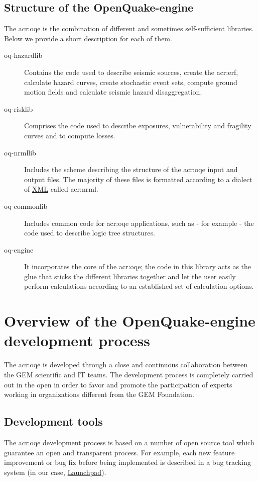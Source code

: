 \subsection{Structure of the OpenQuake-engine}
The \gls{acr:oqe} is the combination of different and sometimes 
self-sufficient libraries. Below we provide a short description for each of
them.
\begin{description}
    \item [oq-hazardlib] Contains the code used to describe 
        seismic sources, create the \gls{acr:erf}, calculate hazard curves, 
        create stochastic event sets, compute ground motion fields and 
        calculate seismic hazard disaggregation.
    \item [oq-risklib] Comprises the code used to describe exposures, 
        vulnerability and fragility curves and to compute losses.
    \item [oq-nrmllib] Includes the scheme describing the structure of 
        the \gls{acr:oqe} input and output files. The majority of these files 
        is formatted according to a dialect of 
        \href{http://www.w3.org/XML/}{XML} called \gls{acr:nrml}. 
    \item [oq-commonlib] Includes common code for \gls{acr:oqe} applications,
        such as - for example - the code used to describe logic tree structures.
    \item [oq-engine] It incorporates the core of the \gls{acr:oqe}; 
        the code in this library acts as the glue that sticks the 
        different libraries together and let the user easily perform 
        calculations according to an established set of calculation 
        options.
\end{description}
%
\section{Overview of the OpenQuake-engine development process}
%
The \gls{acr:oqe} is developed through a close and continuous collaboration 
between the GEM scientific and IT teams. The development process is completely
carried out in the open in order to favor and promote the
participation of experts working in organizations different from the GEM 
Foundation.
%
\subsection{Development tools}
%
The \gls{acr:oqe} development process is based on a number of open 
source tool which guarantee an open and transparent process. 
%
For example, each new feature improvement or bug fix before being 
implemented is described in a bug tracking system (in our case, 
\href{https://launchpad.net/}{Launchpad}).  

